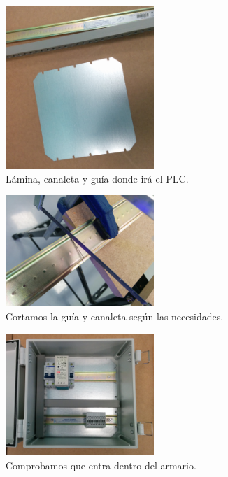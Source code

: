     \begin{figure}[H]
            \centering
            \includegraphics[width=0.5\textwidth]{images/cuadro/IMG_20150311_162414.jpg}
            \caption{Lámina, canaleta y guía donde irá el PLC.}
            \label{fig:cuad_montaje1}
    \end{figure}
    \begin{figure}[H]
            \centering
            \includegraphics[width=0.5\textwidth]{images/cuadro/IMG_20150311_164348.jpg}
            \caption{Cortamos la guía y canaleta según las necesidades.}
            \label{fig:cuad_montaje2}
    \end{figure}
    \begin{figure}[H]
            \centering
            \includegraphics[width=0.5\textwidth]{images/cuadro/IMG_20150313_143943.jpg}
            \caption{Comprobamos que entra dentro del armario.}
            \label{fig:cuad_montaje3}
    \end{figure}
